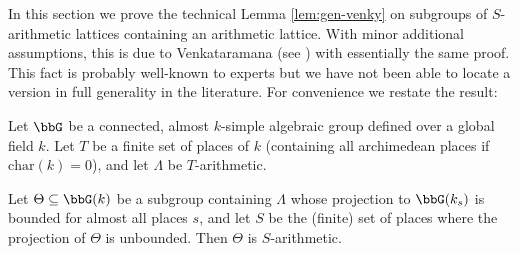 In this section we prove the technical Lemma \ref{lem:gen-venky} on subgroups of $S$-arithmetic lattices containing an arithmetic lattice. With minor additional assumptions, this is due to Venkataramana (see \cite[Prop.\,2.3]{lubotzky-zimmer}) with essentially the same proof. This fact is probably well-known to experts but we have not been able to locate a version in full generality in the literature. For convenience we restate the result:
\begin{lemma}\label{lem:regen-venky}
Let $\bbG$ be a connected, almost $k$-simple algebraic group defined over a global field $k$. Let $T$ be a finite set of places of $k$ (containing all archimedean places if $\mathrm{char}(k)=0$), and let $\Lambda$ be $T$-arithmetic.

Let $\Theta\subseteq \bbG(k)$ be a subgroup containing $\Lambda$ whose projection to $\bbG(k_s)$ is bounded for almost all places $s$, and let $S$ be the (finite) set of places where the projection of $\Theta$ is unbounded. Then $\Theta$ is $S$-arithmetic.
\end{lemma}

